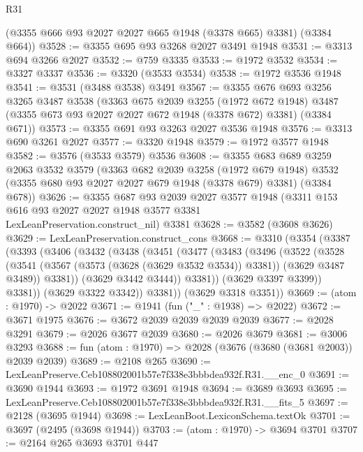 \begin{lexlean}{R31}
\begin{coremodule}
      (@3355 @666 @93 @2027 @2027 @665 @1948 (@3378 @665) @3381)
      (@3384 @664))
@3528 := @3355 @695 @93 @3268 @2027 @3491 @1948
@3531 := @3313 @694 @3266 @2027
@3532 := @759 @3335
@3533 := @1972 @3532
@3534 := @3327 @3337
@3536 := @3320 (@3533 @3534)
@3538 := @1972 @3536 @1948
@3541 := @3531 (@3488 @3538) @3491
@3567 := @3355
    @676
    @693
    @3256
    @3265
    @3487
    @3538
    (@3363
      @675
      @2039
      @3255
      (@1972 @672 @1948)
      @3487
      (@3355 @673 @93 @2027 @2027 @672 @1948 (@3378 @672) @3381)
      (@3384 @671))
@3573 := @3355 @691 @93 @3263 @2027 @3536 @1948
@3576 := @3313 @690 @3261 @2027
@3577 := @3320 @1948
@3579 := @1972 @3577 @1948
@3582 := @3576 (@3533 @3579) @3536
@3608 := @3355
    @683
    @689
    @3259
    @2063
    @3532
    @3579
    (@3363
      @682
      @2039
      @3258
      (@1972 @679 @1948)
      @3532
      (@3355 @680 @93 @2027 @2027 @679 @1948 (@3378 @679) @3381)
      (@3384 @678))
@3626 := @3355
    @687
    @93
    @2039
    @2027
    @3577
    @1948
    (@3311 @153 @616 @93 @2027 @2027 @1948 @3577 @3381 LexLeanPreservation.construct_nil)
    @3381
@3628 := @3582 (@3608 @3626)
@3629 := LexLeanPreservation.construct_cons
@3668 := @3310
    (@3354
      (@3387
        (@3393
          (@3406
            (@3432
              (@3438
                (@3451
                  (@3477
                    (@3483
                      (@3496
                        (@3522
                          (@3528
                            (@3541
                              (@3567 (@3573 (@3628 (@3629 @3532 @3534)) @3381))
                              (@3629 @3487 @3489))
                            @3381))
                        (@3629 @3442 @3444))
                      @3381))
                  (@3629 @3397 @3399))
                @3381))
            (@3629 @3322 @3342))
          @3381))
      (@3629 @3318 @3351))
@3669 := (atom : @1970) -> @2022
@3671 := @1941 (fun ("_" : @1938) => @2022)
@3672 := @3671 @1975
@3676 := @3672 @2039 @2039 @2039 @2039
@3677 := @2028 @3291
@3679 := @2026 @3677 @2039
@3680 := @2026 @3679
@3681 := @3006 @3293
@3688 := fun (atom : @1970) => @2028 (@3676 (@3680 (@3681 @2003)) @2039 @2039)
@3689 := @2108 @265
@3690 := LexLeanPreserve.Ceb108802001b57e7f338e3bbbdea932f.R31.__enc_0
@3691 := @3690 @1944
@3693 := @1972 @3691 @1948
@3694 := @3689 @3693
@3695 := LexLeanPreserve.Ceb108802001b57e7f338e3bbbdea932f.R31.__fits_5
@3697 := @2128 (@3695 @1944)
@3698 := LexLeanBoot.LexiconSchema.textOk
@3701 := @3697 (@2495 (@3698 @1944))
@3703 := (atom : @1970) -> @3694 @3701
@3707 := @2164 @265 @3693 @3701 @447

\end{coremodule}
\end{lexlean}
